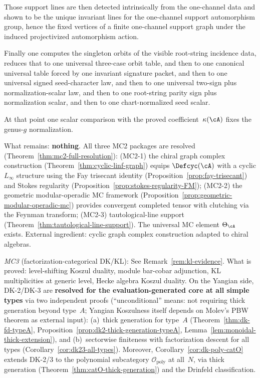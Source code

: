 \begin{remark}
Those support lines are then detected intrinsically from the one-channel
data and shown to be the unique invariant lines for the one-channel
support automorphism group, hence the fixed vertices of a finite
one-channel support graph under the induced projectivized automorphism
action.

Finally one computes the singleton orbits of the visible root-string
incidence data, reduces that to one universal three-case orbit table,
and then to one canonical universal table forced by one invariant
signature packet, and then to one universal signed seed-character law,
and then to one universal two-sign plus normalization-scalar law, and
then to one root-string parity sign plus normalization scalar, and then
to one chart-normalized seed scalar.

At that point one scalar comparison with the proved
coefficient~$\kappa(\cA)$ fixes the genus-$g$ normalization.

What remains: \textbf{nothing}.  All three MC2 packages are
resolved (Theorem~\ref{thm:mc2-full-resolution}):
\textup{(MC2-1)} the chiral graph complex construction
(Theorem~\ref{thm:cyclic-linf-graph}) equips $\Defcyc(\cA)$ with a
cyclic $L_\infty$ structure using the Fay trisecant identity
(Proposition~\ref{prop:fay-trisecant}) and Stokes regularity
(Proposition~\ref{prop:stokes-regularity-FM});
\textup{(MC2-2)} the geometric modular-operadic MC framework
(Proposition~\ref{prop:geometric-modular-operadic-mc}) provides
convergent completed tensor with clutching via the Feynman transform;
\textup{(MC2-3)} tautological-line support
(Theorem~\ref{thm:tautological-line-support}).
The universal MC element $\Theta_{\cA}$ exists.
External ingredient: cyclic graph complex construction adapted to
chiral algebras.

\emph{MC3} (factorization-categorical DK/KL):
See Remark~\ref{rem:kl-evidence}.  What is proved: level-shifting
Koszul duality, module bar-cobar adjunction, KL multiplicities at
generic level, Hecke algebra Koszul duality.
On the Yangian side, DK-2/DK-3 are \textbf{resolved
for the evaluation-generated core at all simple types} via two
independent proofs (``unconditional'' means: not requiring thick
generation beyond type~$A$; Yangian Koszulness itself depends on
Molev's PBW theorem \cite{molev-yangians} as external input):
\textup{(a)}~thick generation for type~$A$
(Theorem~\ref{thm:dk-fd-typeA},
Proposition~\ref{prop:dk2-thick-generation-typeA},
Lemma~\ref{lem:monoidal-thick-extension}), and
\textup{(b)}~sectorwise finiteness with factorization descent for
all types (Corollary~\ref{cor:dk23-all-types}).
Moreover, Corollary~\ref{cor:dk-poly-catO} extends DK-2/3 to
the polynomial subcategory $\mathcal{O}_{\mathrm{poly}}$ at all~$N$,
via thick generation (Theorem~\ref{thm:catO-thick-generation})
and the Drinfeld classification.


\end{remark}
